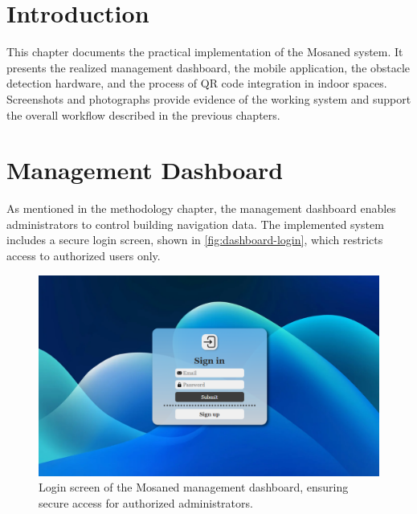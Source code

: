 \section{Introduction}

This chapter documents the practical implementation of the Mosaned system. It presents the realized management dashboard, the mobile application, the obstacle detection hardware, and the process of QR code integration in indoor spaces. Screenshots and photographs provide evidence of the working system and support the overall workflow described in the previous chapters.

\section{Management Dashboard}

As mentioned in the methodology chapter, the management dashboard enables administrators to control building navigation data. The implemented system includes a secure login screen, shown in \autoref{fig:dashboard-login}, which restricts access to authorized users only.
\begin{figure}[h]
	\centering
	\includegraphics[width=1\textwidth]{assets/ch5_imp/login_page.png}
	\caption{Login screen of the Mosaned management dashboard, ensuring secure access for authorized administrators.}
	\label{fig:dashboard-login}
\end{figure}

